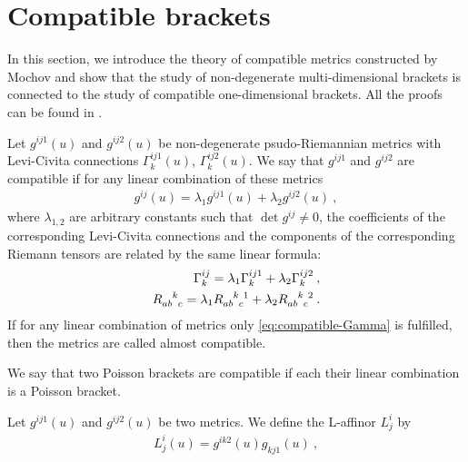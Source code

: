 \section{Compatible brackets}

In this section, we introduce the theory of compatible metrics constructed by Mochov and show that the study of non-degenerate multi-dimensional brackets is connected to the study of compatible one-dimensional brackets. All the proofs can be found in \cite{Mochov}. 

\begin{definition}
    Let $g^{ij1}(u)$ and $g^{ij2}(u)$ be non-degenerate psudo-Riemannian metrics with Levi-Civita connections $\Gamma^{ij1}_k(u)$, $\Gamma^{ij2}_k(u)$. We say that $g^{ij1}$ and $g^{ij2}$ are compatible if for any linear combination of these metrics
    \begin{align}
        g^{ij}(u) = \lambda_1 g^{ij1}(u) + \lambda_2 g^{ij2}(u) \:,
    \end{align}
    where $\lambda_{1,2}$ are arbitrary constants such that $\det g^{ij} \neq 0$, the coefficients of the corresponding Levi-Civita connections and the components of the corresponding Riemann tensors are related by the same linear formula:
    \begin{align}
        \Gamma^{ij}_k = \lambda_1 \Gamma^{ij1}_k + \lambda_2 \Gamma^{ij2}_k \:, \label{eq:compatible-Gamma}\\
        R\indices{_a_b^k_c} = \lambda_1 R\indices{_a_b^k_c^1} + \lambda_2 R\indices{_a_b^k_c^2} \label{eq:compatible-R}\:.
    \end{align}
    If for any linear combination of metrics only \eqref{eq:compatible-Gamma} is fulfilled, then the metrics are called almost compatible.
\end{definition}


\begin{definition}
    We say that two Poisson brackets are compatible if each their linear combination is a Poisson bracket.
\end{definition}

\begin{definition}[L-affinor]
    Let $g^{ij1}(u)$ and $g^{ij2}(u)$ be two metrics.
    We define the L-affinor $L^i_j$ by
    \begin{align}
        L^i_j(u) = g^{ik2}(u) g_{kj1}(u) \:,
    \end{align}
\end{definition}

